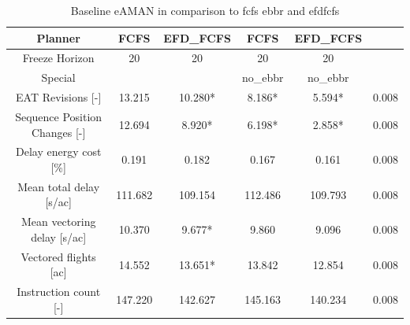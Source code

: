 \begin{table}[htbp]
\caption{Baseline eAMAN in comparison to fcfs ebbr and efdfcfs}
\begin{center}
\footnotesize
\setlength{\tabcolsep}{3pt}
\renewcommand{\arraystretch}{1.000}
\begin{tabular}{|c|c|c|c|c|c|}
\hline
Planner & FCFS & EFD\_FCFS & FCFS & EFD\_FCFS &  \\
\hline
Freeze Horizon & 20 & 20 & 20 & 20 &  \\
\hline
Special &  &  & no\_ebbr & no\_ebbr &  \\
\hline
EAT Revisions [-] & 13.215 & 10.280* & 8.186* & 5.594* & 0.008 \\
\hline
Sequence Position Changes [-] & 12.694 & 8.920* & 6.198* & 2.858* & 0.008 \\
\hline
Delay energy cost [\%] & 0.191 & 0.182 & 0.167 & 0.161 & 0.008 \\
\hline
Mean total delay [s/ac] & 111.682 & 109.154 & 112.486 & 109.793 & 0.008 \\
\hline
Mean vectoring delay [s/ac] & 10.370 & 9.677* & 9.860 & 9.096 & 0.008 \\
\hline
Vectored flights [ac] & 14.552 & 13.651* & 13.842 & 12.854 & 0.008 \\
\hline
Instruction count [-] & 147.220 & 142.627 & 145.163 & 140.234 & 0.008 \\
\hline
\end{tabular}
\label{tab:baseline\_eaman\_in\_comparison\_to\_fcfs\_ebbr\_and\_efdfcfs}
\end{center}
\end{table}